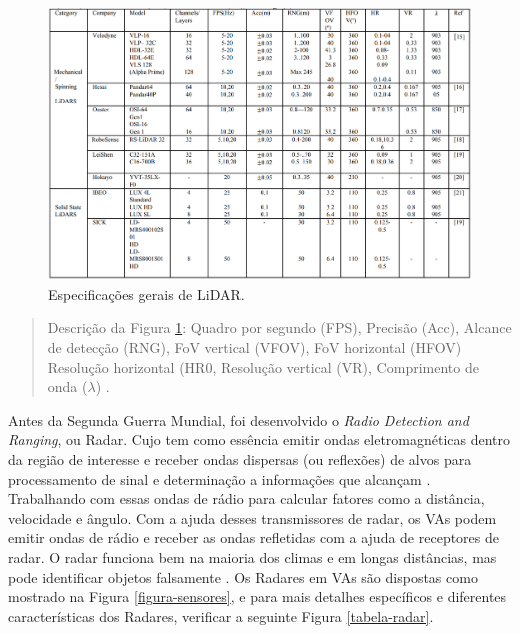 \begin{figure}[H]
\centering
\includegraphics[width=\textwidth]{Figures/lidar-table.png}
\caption{Especificações gerais de LiDAR.}
\label{tabela-lidar}
\end{figure}

\begin{quote}
Descrição da Figura \ref{tabela-lidar}: Quadro por segundo (FPS), Precisão (Acc), Alcance de detecção (RNG), FoV vertical (VFOV), FoV horizontal (HFOV) Resolução horizontal (HR0, Resolução vertical (VR), Comprimento de onda ($\lambda$) \cite{sensors}.
\end{quote}





Antes da Segunda Guerra Mundial, foi desenvolvido o \textit{Radio Detection and Ranging}, ou Radar. Cujo tem como essência emitir ondas eletromagnéticas dentro da região de interesse e receber ondas dispersas (ou reflexões) de alvos para processamento de sinal e determinação a informações que alcançam \cite{sensors}. Trabalhando com essas ondas de rádio para calcular fatores como a distância, velocidade e ângulo. Com a ajuda desses transmissores de radar, os VAs podem emitir ondas de rádio e receber as ondas refletidas com a ajuda de receptores de radar. O radar funciona bem na maioria dos climas e em longas distâncias, mas pode identificar objetos falsamente \cite{review-auto}.
Os Radares em VAs são dispostas como mostrado na Figura \ref{figura-sensores}, e para mais detalhes específicos e diferentes características dos Radares, verificar a seguinte Figura \ref{tabela-radar}.



